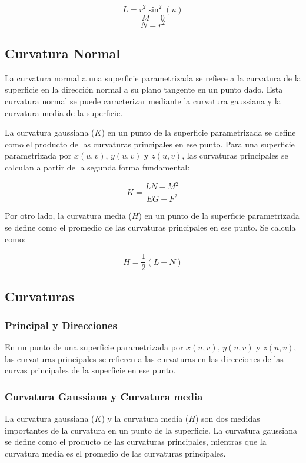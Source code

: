\documentclass{article}
\begin{document}
	$$ L = r^2 \sin^2(u) $$
	$$ M = 0 $$
	$$ N = r^2 $$
	
	
	\subsection{Curvatura Normal}
	
	La curvatura normal a una superficie parametrizada se refiere a la curvatura de la superficie en la dirección normal a su plano tangente en un punto dado. Esta curvatura normal se puede caracterizar mediante la curvatura gaussiana y la curvatura media de la superficie.
	
	La curvatura gaussiana ($K$) en un punto de la superficie parametrizada se define como el producto de las curvaturas principales en ese punto. Para una superficie parametrizada por $x(u,v)$, $y(u,v)$ y $z(u,v)$, las curvaturas principales se calculan a partir de la segunda forma fundamental:
	
	$$ K = \frac{LN - M^2}{EG - F^2} $$
	
	Por otro lado, la curvatura media ($H$) en un punto de la superficie parametrizada se define como el promedio de las curvaturas principales en ese punto. Se calcula como:
	
	$$ H = \frac{1}{2}(L + N) $$
	
	\subsection{Curvaturas}
	
	\subsubsection{Principal y Direcciones}
	
	 En un punto de una superficie parametrizada por $x(u,v)$, $y(u,v)$ y $z(u,v)$, las curvaturas principales se refieren a las curvaturas en las direcciones de las curvas principales de la superficie en ese punto.
	
	\subsubsection{Curvatura Gaussiana y Curvatura media}
	
	La curvatura gaussiana ($K$) y la curvatura media ($H$) son dos medidas importantes de la curvatura en un punto de la superficie. La curvatura gaussiana se define como el producto de las curvaturas principales, mientras que la curvatura media es el promedio de las curvaturas principales.
	
\end{document}
